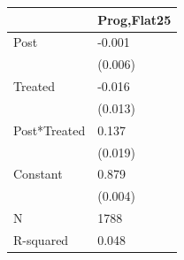 \begin{tabular}{ll}
\toprule
 & Prog,Flat25 \\
\midrule
Post & -0.001 \\
 & (0.006) \\
Treated & -0.016 \\
 & (0.013) \\
Post*Treated & 0.137 \\
 & (0.019) \\
Constant & 0.879 \\
 & (0.004) \\
N & 1788 \\
R-squared & 0.048 \\
\bottomrule
\end{tabular}
